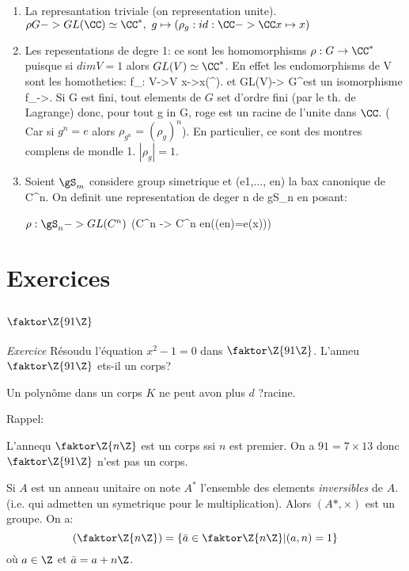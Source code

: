 \begin{examplebox}
	\begin{enumerate}
		\item La represantation triviale (on representation unite). $\rho G->GL(\CC)\simeq\CC^\ast,\ g\mapsto (\rho_g: id:\CC->\CC x\mapsto x)$
		\item Les repesentations de degre 1: ce sont les homomorphisms $\rho:G\rightarrow \CC^\ast$ puisque si $dim V= 1$ alors $GL(V)\simeq\CC^\ast$.
		En effet les endomorphisms de V sont les homotheties: f_\lambda: V->V x->\lambda x(\lambda\in \CC^\ast). et GL(V)-> G^\ast est un isomorphisme f_\lambda->\lambda.
		Si G est fini, tout elements de $G$ set d'ordre fini (par le th. de Lagrange) donc, pour tout g in G, roge est un racine de l'unite dans $\CC$.
		( Car si $g^n=e$ alors $\rho_{g^n}=(\rho_g)^n$). En particulier, ce sont des montres complens de mondle 1. $|\rho_g|=1$.
		\item Soient $\gS_m$ considere group simetrique et (e1,..., en) la bax canonique de C^n. On definit une representation de deger n de gS_n en posant:
		
		$\rho:\gS_n->GL(C^n)$ \sigma\mapsto(\rho C^n -> C^n en\mapsto (\rho(en)=e\sigma(x)))
	\end{enumerate}
\end{examplebox}


\chapter{Exercices}

\section{$\faktor\Z{91\Z}$}

\emph{Exercice}
Résoudu l'équation $x^2-1=0$ dans $\faktor\Z{91\Z}$. L'anneu $\faktor\Z{91\Z}$ ets-il un corps?
\begin{remark}
	Un polynôme dans un corps $K$ ne peut avon plus $d$ ?racine.
\end{remark}

Rappel:

L'annequ $\faktor\Z{n\Z}$ est un corps ssi $n$ est premier. On a $91=7\times 13$ donc $\faktor\Z{91\Z}$ n'est pas un corps.

Si $A$ est un anneau unitaire on note $A^{\ast}$ l'ensemble des elements \emph{inversibles} de $A$. (i.e. qui admetten un symetrique pour le multiplication). Alors $(A\ast,\times)$ est un groupe. On a:
$$(\faktor\Z{n\Z})=\{\bar a\in \faktor\Z{n\Z}|(a,n)=1\}$$ où $a\in\Z$ et $\bar a=a+n\Z$.

